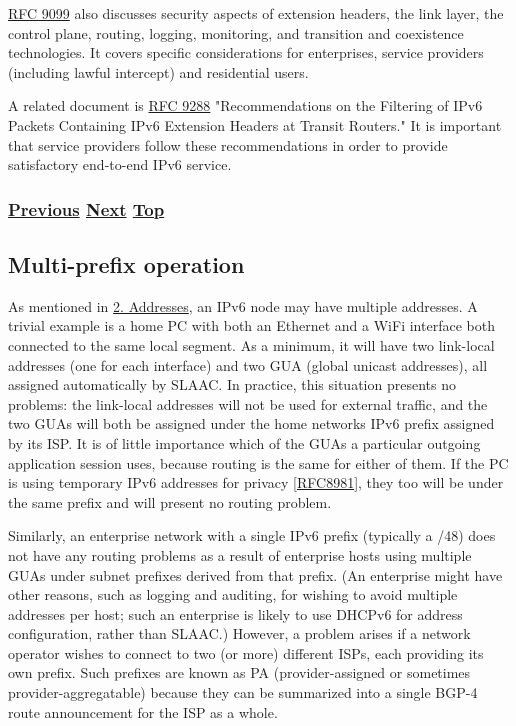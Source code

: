 \documentclass[
]{article}
\begin{document}
\href{https://www.rfc-editor.org/info/rfc9099}{RFC 9099} also discusses
security aspects of extension headers, the link layer, the control
plane, routing, logging, monitoring, and transition and coexistence
technologies. It covers specific considerations for enterprises, service
providers (including lawful intercept) and residential users.

A related document is \href{https://www.rfc-editor.org/info/rfc9288}{RFC
9288} "Recommendations on the Filtering of IPv6 Packets Containing IPv6
Extension Headers at Transit Routers." It is important that service
providers follow these recommendations in order to provide satisfactory
end-to-end IPv6 service.

\subsubsection{\texorpdfstring{\hyperref[routing-operation]{Previous}
\hyperref[multi-prefix-operation]{Next}
\hyperref[management-and-operations]{Top}}{Previous Next Top}}\label{previous-next-top-30}

\pagebreak

\subsection{Multi-prefix operation}\label{multi-prefix-operation}

As mentioned in \hyperref[addresses]{2. Addresses}, an IPv6 node may
have multiple addresses. A trivial example is a home PC with both an
Ethernet and a WiFi interface both connected to the same local segment.
As a minimum, it will have two link-local addresses (one for each
interface) and two GUA (global unicast addresses), all assigned
automatically by SLAAC. In practice, this situation presents no
problems: the link-local addresses will not be used for external
traffic, and the two GUAs will both be assigned under the home
network\textquotesingle s IPv6 prefix assigned by its ISP. It is of
little importance which of the GUAs a particular outgoing application
session uses, because routing is the same for either of them. If the PC
is using temporary IPv6 addresses for privacy
{[}\href{https://www.rfc-editor.org/info/rfc8981}{RFC8981}{]}, they too
will be under the same prefix and will present no routing problem.

Similarly, an enterprise network with a single IPv6 prefix (typically a
/48) does not have any routing problems as a result of enterprise hosts
using multiple GUAs under subnet prefixes derived from that prefix. (An
enterprise might have other reasons, such as logging and auditing, for
wishing to avoid multiple addresses per host; such an enterprise is
likely to use DHCPv6 for address configuration, rather than SLAAC.)
However, a problem arises if a network operator wishes to connect to two
(or more) different ISPs, each providing its own prefix. Such prefixes
are known as PA (provider-assigned or sometimes provider-aggregatable)
because they can be summarized into a single BGP-4 route announcement
for the ISP as a whole.
\end{document}
